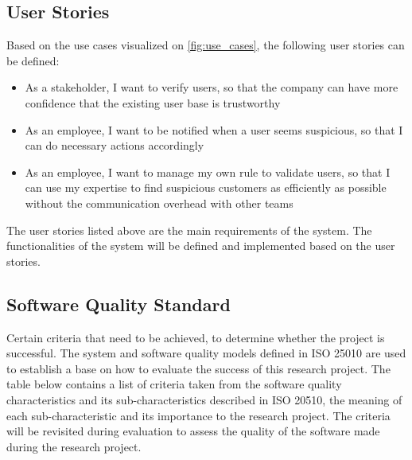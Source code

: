   \subsection{User Stories}

    Based on the use cases visualized on \autoref{fig:use_cases}, the following user stories can be defined:

    \begin{itemize}
     \item As a stakeholder, I want to verify users, so that the company can have more confidence that the existing user base is trustworthy 
     \item As an employee, I want to be notified when a user seems suspicious, so that I can do necessary actions accordingly
     \item As an employee, I want to manage my own rule to validate users, so that I can use my expertise to find suspicious customers as efficiently as possible without the communication overhead with other teams
    \end{itemize}

    The user stories listed above are the main requirements of the system. The functionalities of the system will be defined and implemented based on the user stories.
    
  \subsection{Software Quality Standard}
    \label{criteria}

    Certain criteria that need to be achieved, to determine whether the project is successful. The system and software quality models defined in ISO 25010 \autocite{iso-2011} are used to establish a base on how to evaluate the success of this research project. The table below contains a list of criteria taken from the software quality characteristics and its sub-characteristics described in ISO 20510, the meaning of each sub-characteristic and its importance to the research project. The criteria will be revisited during evaluation to assess the quality of the software made during the research project. 

